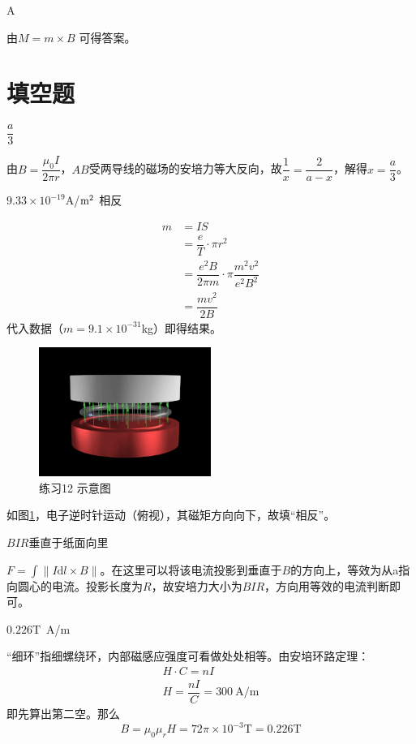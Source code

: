 \documentclass[b5paper,opensource,sourcefont,parskip]{qyxf-book}
\newcommand{\di}[1]{\mathrm{d}#1}
\begin{document}
A

\solve
由$M=m\times B$
\footnotemark[2]
可得答案。

\section{填空题}

$\dfrac{a}{3}$

\solve
由$B=\dfrac{\mu_0I}{2\pi r}$，$AB$受两导线的磁场的安培力等大反向，故$\dfrac{1}{x}=\dfrac{2}{a-x}$，解得$x=\dfrac{a}{3}$。

$9.33\times 10^{-19}$A/$\rm{m}^2$ \quad 相反
 
\solve
\begin{align*}
	m&=IS\\
	&=\dfrac{e}{T}\cdot \pi r^2\\
	&=\dfrac{e^2B}{2\pi m}\cdot \pi\dfrac{m^2v^2}{e^2B^2}\\
	&=\dfrac{mv^2}{2B}
\end{align*}
代入数据（$m=9.1\times 10^{-31}$kg）即得结果。
\begin{figure}[!h]	
	\centering	
	\includegraphics[width=0.5\textwidth]{Chp9_illus1.png}	
	\caption{练习12 示意图}\label{fig:c9-t12}
\end{figure}
如图\ref{fig:c9-t12}，电子逆时针运动（俯视），其磁矩方向向下，故填“相反”。

$BIR$\quad 垂直于纸面向里

\solve
$F=\int \|I\di{l}\times B\|$。在这里可以将该电流投影到垂直于$B$的方向上，等效为从a指向圆心的电流。投影长度为$R$，故安培力大小为$BIR$，方向用等效的电流判断即可。

$0.226\textrm{T}$\ \textrm{A/m}

\solve
“细环”指细螺绕环，内部磁感应强度可看做处处相等。由安培环路定理：
\begin{gather*}
	H\cdot C=nI\\
	H=\dfrac{nI}{C}=300\ \textrm{A/m}
\end{gather*}
即先算出第二空。那么
\[
B=\mu_0\mu_rH=72\pi\times 10^{-3}\textrm{T}=0.226\textrm{T}
\]
\end{document}
